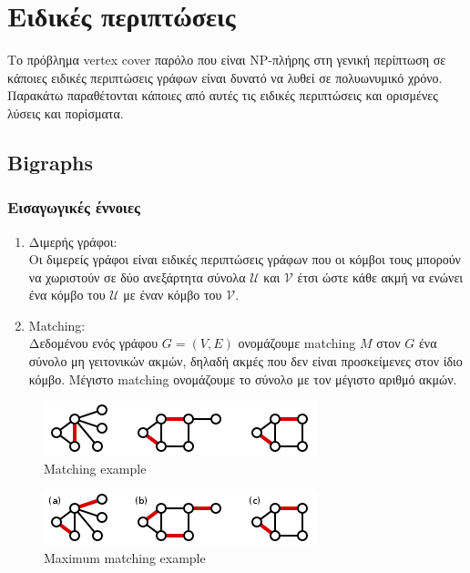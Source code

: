 
\chapter{Ειδικές περιπτώσεις} %

\label{Chapter3} %
Το πρόβλημα vertex cover παρόλο που είναι NP-πλήρης στη γενική περίπτωση σε κάποιες ειδικές περιπτώσεις γράφων είναι δυνατό να λυθεί σε πολυωνυμικό χρόνο. Παρακάτω παραθέτονται κάποιες από αυτές τις ειδικές περιπτώσεις και ορισμένες λύσεις και πορίσματα.

\section{Bigraphs}

\subsection{Εισαγωγικές έννοιες}

\begin{enumerate}
\item
Διμερής γράφοι:\\
Οι διμερείς γράφοι είναι ειδικές περιπτώσεις γράφων που οι κόμβοι τους μπορούν να χωριστούν σε δύο ανεξάρτητα σύνολα $\mathcal{U}$ και $\mathcal{V}$ έτσι ώστε κάθε ακμή να ενώνει ένα κόμβο του $\mathcal{U}$ με έναν κόμβο του $\mathcal{V}$. 
\item
Matching:\\
Δεδομένου ενός γράφου $G=(V,E)$ ονομάζουμε matching $Μ$ στον $G$ ένα σύνολο μη γειτονικών ακμών, δηλαδή ακμές που δεν είναι προσκείμενες στον ίδιο κόμβο. Μέγιστο matching ονομάζουμε το σύνολο με τον μέγιστο αριθμό ακμών.
\end{enumerate}
\begin{figure}[H]
\caption{Matching example}
\centering
\includegraphics{Figures/match.png}\centering
\end{figure}

\begin{figure}[H]
\caption{Maximum matching example}
\centering
\includegraphics{Figures/max_match.png}\centering
\end{figure}

